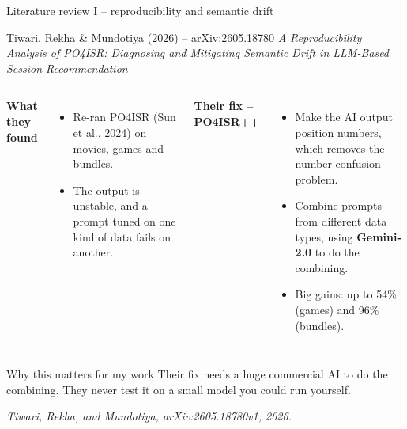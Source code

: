 \documentclass[aspectratio=169,12pt]{beamer}
\newcommand{\source}[1]{\vspace{0.35em}\par{\tiny\color{Muted}\textit{#1}}}
\begin{document}
\begin{frame}{Literature review I -- reproducibility and semantic drift}
\begin{block}{Tiwari, Rekha \& Mundotiya (2026) -- arXiv:2605.18780}
\emph{A Reproducibility Analysis of PO4ISR: Diagnosing and Mitigating
Semantic Drift in LLM-Based Session Recommendation}
\end{block}

\begin{columns}[T]
\textbf{What they found}
\begin{itemize}
  \item Re-ran PO4ISR (Sun et al., 2024) on movies, games and bundles.
  \item The output is unstable, and a prompt tuned on one kind of data
        fails on another.
\end{itemize}

\textbf{Their fix -- PO4ISR++}
\begin{itemize}
  \item Make the AI output position numbers, which removes the
        number-confusion problem.
  \item Combine prompts from different data types, using
        \textbf{Gemini-2.0} to do the combining.
  \item Big gains: up to 54\% (games) and 96\% (bundles).
\end{itemize}
\end{columns}

\vspace{0.5em}
\begin{alertblock}{Why this matters for my work}
Their fix needs a huge commercial AI to do the combining. They never test
it on a small model you could run yourself.
\end{alertblock}
\source{Tiwari, Rekha, and Mundotiya, arXiv:2605.18780v1, 2026.}
\end{frame}
\end{document}
